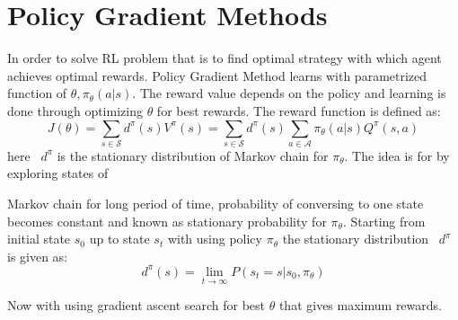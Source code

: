 \section{Policy Gradient Methods}
In order to solve RL problem that is to find optimal strategy with which agent achieves optimal rewards. Policy Gradient Method \cite{Grondman2012} learns with parametrized function of $\displaystyle \theta ,\pi _{\theta } (a|s)$. The reward value depends on the policy and learning is done through optimizing $\displaystyle \theta $ for best rewards. The reward function is defined as:
\begin{equation}
J(\theta )=\sum _{s\in \mathcal{S}} d^{\pi } (s)V^{\pi } (s)=\sum _{s\in \mathcal{S}} d^{\pi } (s)\sum _{a\in \mathcal{A}} \pi _{\theta } (a|s)Q^{\pi } (s,a)
\end{equation}
here \ $\displaystyle d^{\pi }$ is the stationary distribution of Markov chain for $\displaystyle \pi _{\theta }$. The idea is for by exploring states of

Markov chain for long period of time, probability of conversing to one state becomes constant and known as stationary probability for $\displaystyle \pi _{\theta }$. Starting from initial state $\displaystyle s_{0}$ up to state $\displaystyle s_{t}$ with using policy $\displaystyle \pi _{\theta }$ the stationary distribution \ $\displaystyle d^{\pi }$ is given as:
\begin{equation}
d^{\pi } (s)=\lim _{t\rightarrow \infty } P(s_{t} =s|s_{0} ,\pi _{\theta } )
\end{equation}


Now with using gradient ascent search for best $\displaystyle \theta $ that gives maximum rewards.

